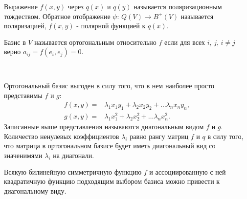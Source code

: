 \begin{definition}
    Выражение $f(x, y)$ через $q(x)$ и $q(y)$ называется поляризационным тождеством.
    Обратное отображение $\psi:\, Q(V) \to B^+(V)$ называется поляризацией,
    $f(x, y)$ - полярной функцией к $q(x)$.
\end{definition}

\begin{definition}
    Базис в $V$ называется ортогональным относительно $f$ если для всех $i$, $j$, $i \neq j$ верно 
    $a_{ij} = f(e_i, e_j) = 0$.
\end{definition}

\begin{note}~

    Ортогональный базис выгоден в силу того, что в нем наиболее просто представимы $f$ и $g$:
    \begin{align*}
        f(x, y) = & \lambda_1 x_1 y_1 + \lambda_2 x_2 y_2 + \dots \lambda_n x_n y_n, \\
        g(x, y) = & \lambda_1 x_1^2 + \lambda_2 x_2^2 + \dots \lambda_n x_n^2.
    \end{align*}
    Записанные выше представления называются диагональным видом $f$ и $g$. Количество 
    ненулевых коэффициентов $\lambda_i$ равно рангу матриц $f$ и $q$ в силу того, что матрица 
    в ортогональном базисе будет иметь диагональный вид со значенимями $\lambda_i$ на диагонали.
\end{note}

\begin{theorem}[Лагранжа]
    Всякую билинейную симметричную функцию $f$ и ассоциированную с ней квадратичную функцию 
    подходящим выбором базиса можно привести к диагональному виду.
\end{theorem}

